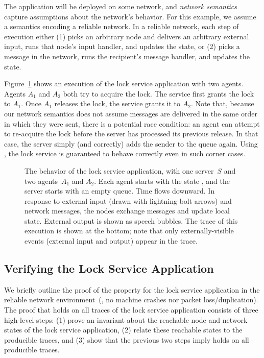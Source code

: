 The application will be deployed on some network, and \emph{network
semantics} capture assumptions about the network's behavior.
%
For this example, we assume a semantics encoding a reliable network.
%
In a reliable network, each step of execution either (1) picks an arbitrary
node and delivers an arbitrary external input, runs that node's input
handler, and updates the state, or (2) picks a message in the network, runs
the recipient's message handler, and updates the state.

Figure~\ref{fig:lock-service-diagram} shows an execution of the lock
service application with two agents.
%
Agents $A_1$ and $A_2$ both try to acquire the lock. The service first
grants the lock to $A_1$.
%
Once $A_1$ releases the lock, the service grants it to $A_2$.
%
Note that, because our network semantics does not assume messages are
delivered in the same order in which they were sent, there is a potential
race condition: an agent can attempt to re-acquire the lock before the
server has processed its previous release.
%
In that case, the server simply (and correctly) adds the sender to the
queue again.
%
Using \Verdi, the lock service is guaranteed to behave correctly even
in such corner cases.
\begin{figure}[t]
  \centering
  

  \caption{The behavior of the lock service application, with one
    server~$S$ and two agents~$A_1$ and $A_2$.
    Each agent starts with the state , and the server starts
    with an empty queue.
    Time flows downward.
    In response to external input (drawn with lightning-bolt arrows) and
    network messages, the nodes exchange messages and update local state.
    External output is shown as speech bubbles.
    The trace of this execution is shown at the bottom; note that only
  externally-visible events (external input and output) appear in the trace.}

\label{fig:lock-service-diagram}
\end{figure}

\subsection{Verifying the Lock Service Application}

We briefly outline the proof of the  property for the lock
service application in the reliable network environment~(\ie, no machine
crashes nor packet loss/duplication).
%
The proof that  holds on all traces of the lock service
application consists of three high-level steps: (1) prove an invariant
about the reachable node and network states of the lock service
application, (2) relate these reachable states to the producible traces,
and (3) show that the previous two steps imply  holds on all
producible traces.

